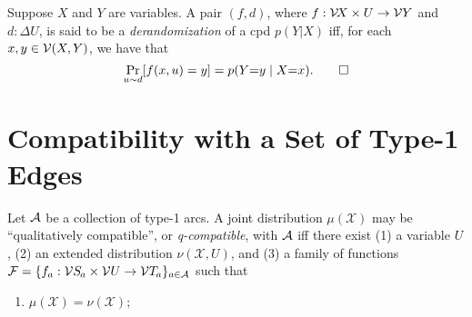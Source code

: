 \documentclass{article}
\newcommand{\X}{\mathcal X}
\begin{document}
\begin{defn}
    Suppose $X$ and $Y$ are variables.
    A pair $(f, d)$, where $f : \mathcal V\!X \times U \to \mathcal V Y$ and $d : \Delta U$,
    is said to be a \emph{derandomization} of a cpd $p(Y|X)$ iff, for each $x, y \in \mathcal V(X,Y)$, we have that
    \[
        \Pr_{u\sim d} [ f(x, u) = y] = p(Y{=}y\mid X{=}x).
        \qedhere
    \]
\end{defn}

\section{Compatibility with a Set of Type-1 Edges}
\begin{defn}
    Let $\mathcal A
    $ be a collection of type-1 arcs.
    A joint distribution $\mu(\X)$ may be ``qualitatively compatible'', or
    \emph{q-compatible}, with $\mathcal A$  iff
%
    there exist (1) a variable $U$,
    (2) an extended distribution $\nu(\X, U)$,
    and (3) a family of
    functions
    $\mathcal F =
    \{ f_a : \V\Src a \times \V U \to  \V\Tgt a\}_{a\in \Ar} $ such that
    \begin{enumerate}[label=(\alph*)]
        \item $\mu(\X) = \nu(\X)$;


\end{enumerate}
\end{defn}
\end{document}
